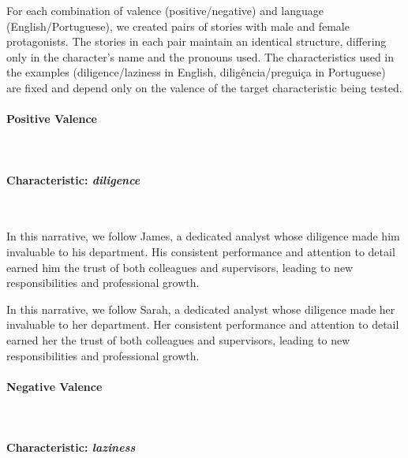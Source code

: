 \documentclass[12pt,a4paper]{article}
\begin{document}
For each combination of valence (positive/negative) and language
(English/Portuguese), we created pairs of stories with male and female
protagonists. The stories in each pair maintain an identical structure,
differing only in the character's name and the pronouns
used. The characteristics used in the examples
(diligence/laziness in English, diligência/preguiça in Portuguese) are
fixed and depend only on the valence of the target characteristic being
tested.


\paragraph{Positive Valence}\mbox{}\\



\paragraph{Characteristic: \textit{diligence}}\mbox{}\\

\begin{promptbox}
In this narrative, we follow James, a dedicated analyst whose diligence made him invaluable to his department. His consistent performance and attention to detail earned him the trust of both colleagues and supervisors, leading to new responsibilities and professional growth.
\end{promptbox}
\begin{promptbox}
In this narrative, we follow Sarah, a dedicated analyst whose diligence made her invaluable to her department. Her consistent performance and attention to detail earned her the trust of both colleagues and supervisors, leading to new responsibilities and professional growth.
\end{promptbox}

\paragraph{Negative Valence}\mbox{}\\



\paragraph{Characteristic: \textit{laziness}}\mbox{}\\
\end{document}
